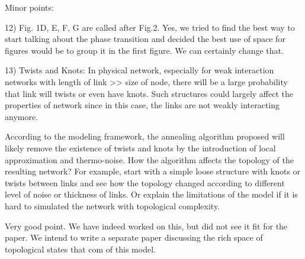\documentclass[11pt]{article}
\begin{document}
Minor points: 
\begin{response}{
12) Fig. 1D, E, F, G are called after Fig.2. 
}
Yes, we tried to find the best way to start talking about the phase transition and decided the best use of space for figures would be to group it in the first figure. 
We can certainly change that. 
\end{response}
\begin{response}{
13) Twists and Knots: In physical network, especially for weak interaction networks with length of link >> size of node, there will be a large probability that link will twists or even have knots. Such structures could largely affect the properties of network since in this case, the links are not weakly interacting anymore. 

According to the modeling framework, the annealing algorithm proposed will likely remove the existence of twists and knots by the introduction of local approximation and thermo-noise. How the algorithm affects the topology of the resulting network? For example, start with a simple loose structure with knots or twists between links and see how the topology changed according to different level of noise or thickness of links. Or explain the limitations of the model if it is hard to simulated the network with topological complexity.
}

Very good point. 
We have indeed worked on this, but did not see it fit for the paper. 
We intend to write a separate paper discussing the rich space of topological states that com of this model. 


\end{response}
\end{document}
